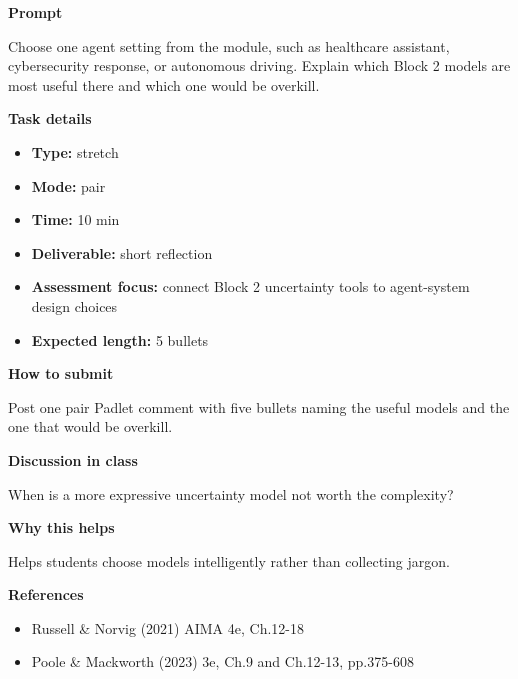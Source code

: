 \documentclass[11pt]{article}
\begin{document}
\begin{tcolorbox}[colback=white,colframe=MidnightBlue,title={Q8 Stretch Cross-Block Reflection},fonttitle=\bfseries,breakable]
\begin{center}
\end{center}

{\large\bfseries\color{MidnightBlue} Prompt}\par\medskip
Choose one agent setting from the module, such as healthcare assistant, cybersecurity response, or autonomous driving. Explain which Block 2 models are most useful there and which one would be overkill.

{\large\bfseries\color{MidnightBlue} Task details}\par\medskip
\begin{itemize}\item \textbf{Type:} stretch
\item \textbf{Mode:} pair
\item \textbf{Time:} 10 min
\item \textbf{Deliverable:} short reflection
\item \textbf{Assessment focus:} connect Block 2 uncertainty tools to agent-system design choices
\item \textbf{Expected length:} 5 bullets\end{itemize}

{\large\bfseries\color{MidnightBlue} How to submit}\par\medskip
Post one pair Padlet comment with five bullets naming the useful models and the one that would be overkill.

{\large\bfseries\color{MidnightBlue} Discussion in class}\par\medskip
When is a more expressive uncertainty model not worth the complexity?

{\large\bfseries\color{MidnightBlue} Why this helps}\par\medskip
Helps students choose models intelligently rather than collecting jargon.

{\large\bfseries\color{MidnightBlue} References}\par\medskip
\begin{itemize}\item Russell \& Norvig (2021) AIMA 4e, Ch.12-18
\item Poole \& Mackworth (2023) 3e, Ch.9 and Ch.12-13, pp.375-608\end{itemize}
\end{tcolorbox}
\end{document}
